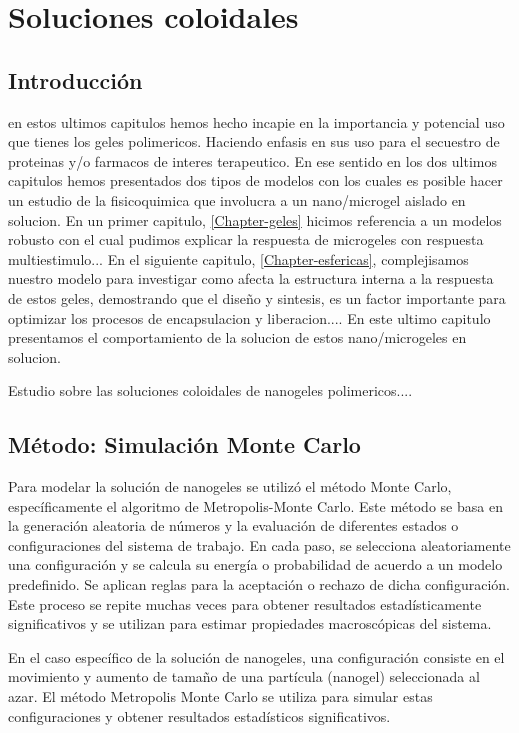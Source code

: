 \chapter{Soluciones coloidales}

\section{Introducci\'on}

en estos ultimos capitulos hemos hecho incapie en la importancia y potencial uso que tienes los geles polimericos. Haciendo enfasis en sus uso para el secuestro de proteinas y/o farmacos de interes terapeutico.
En ese sentido en los dos ultimos capitulos hemos presentados dos tipos de modelos con los cuales es posible hacer un estudio de la fisicoquimica que involucra a un nano/microgel aislado en solucion.
En un primer capitulo, \ref{Chapter-geles} hicimos referencia a un modelos robusto con el cual pudimos explicar la respuesta de microgeles con respuesta multiestimulo... 
En el siguiente capitulo, \ref{Chapter-esfericas}, complejisamos nuestro modelo para investigar como afecta la estructura interna a la respuesta de estos geles, demostrando que el dise\~no  y sintesis,  es un factor importante para optimizar los procesos de encapsulacion y liberacion....
En este ultimo capitulo presentamos el comportamiento de la solucion de estos nano/microgeles en solucion. 


Estudio sobre las soluciones coloidales de nanogeles polimericos....

\section{M\'etodo: Simulaci\'on Monte Carlo}

Para modelar la soluci\'on de nanogeles se utiliz\'o el m\'etodo Monte Carlo, espec\'ificamente el algoritmo de Metropolis-Monte Carlo. Este m\'etodo se basa en la generaci\'on aleatoria de n\'umeros y la evaluaci\'on de diferentes estados o configuraciones del sistema de trabajo. En cada paso, se selecciona aleatoriamente una configuraci\'on y se calcula su energ\'ia o probabilidad de acuerdo a un modelo predefinido. Se aplican reglas para la aceptaci\'on o rechazo de dicha configuraci\'on. Este proceso se repite muchas veces para obtener resultados estad\'isticamente significativos y se utilizan para estimar propiedades macrosc\'opicas del sistema.

En el caso espec\'ifico de la soluci\'on de nanogeles, una configuraci\'on consiste en el movimiento y aumento de tama\~no de una part\'icula (nanogel) seleccionada al azar. El m\'etodo Metropolis Monte Carlo se utiliza para simular estas configuraciones y obtener resultados estad\'isticos significativos.

